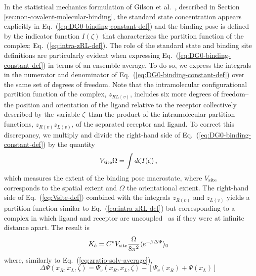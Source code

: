 \documentclass[9pt,bestpractices]{livecoms}
\begin{document}
In the statistical mechanics formulation of Gilson et al.~\cite{gilson1997statisticalthermodynamic}, described in Section \ref{sec:non-covalent-molecular-binding}, the standard state concentration appears explicitly in Eq.~(\ref{eq:DG0-binding-constant-def}) and the binding pose is defined by the indicator function $I(\zeta)$ that characterizes the partition function of the complex; Eq.~(\ref{eq:intra-zRL-def}).  The role of the standard state and binding site definitions are particularly evident when expressing Eq.~(\ref{eq:DG0-binding-constant-def}) in terms of an ensemble average. To do so, we express the integrals in the numerator and denominator of Eq.~(\ref{eq:DG0-binding-constant-def}) over the same set of degrees of freedom. Note that the intramolecular configurational partition function of the complex, $z_{RL(v)}$, includes six more degrees of freedom--the position and orientation of the ligand relative to the receptor collectively described by the variable $\zeta$--than the product of the intramolecular partition functions, $z_{R(v)} z_{L(v)}$, of the separated receptor and ligand. To correct this discrepancy, we multiply and divide the right-hand side of Eq.~(\ref{eq:DG0-binding-constant-def})  by the quantity
\begin{equation} \label{eq:Vsite-def}
    V_{\rm site} \Omega = \int d\zeta I(\zeta) \, ,
\end{equation}
which measures the extent of the binding pose macrostate, where $V_{\rm site}$ corresponds to the spatial extent and $\Omega$ the orientational extent. The right-hand side of Eq.~(\ref{eq:Vsite-def}) combined with the integrals $z_{R(v)}$ and $z_{L(v)}$ yields a partition function similar to Eq.~(\ref{eq:intra-zRL-def}) but corresponding to a complex in which ligand and receptor are uncoupled~\cite{gallicchio2011recent} as if they were at infinite distance apart. The result is
\begin{equation}\label{eq:DG0-binding-constant-def-average}
K_b = C^\circ V_{\rm site} \frac{\Omega}{8 \pi^2} \langle e^{-\beta \Delta \Psi}  \rangle_0 
\end{equation}
where, similarly to Eq.~(\ref{eq:zratio-solv-average}),
\begin{equation}\label{eq:pert-energy-def}
\Delta \Psi(x_R, x_L, \zeta) =  \Psi_v(x_R, x_L, \zeta) - \left[  \Psi_v(x_R) + \Psi(x_L) \right]
\end{equation}
\end{document}
